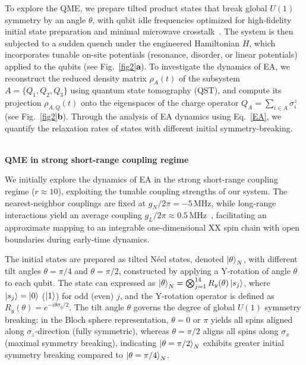 \documentclass[reprint,superscriptaddress,preprintnumbers,longbibliography,
amsmath,amssymb,aps,floatfix,pra,twocolumn, tightenlines %
]{revtex4-2}
\begin{document}
    To explore the QME, we prepare tilted product states that break global $ U(1) $ symmetry by an angle $ \theta $, with qubit idle frequencies optimized for high-fidelity initial state preparation and minimal microwave crosstalk~\cite{supp_cite}.
    The system is then subjected to a sudden quench under the engineered Hamiltonian \( H \), which incorporates tunable on-site potentials (resonance, disorder, or linear potentials) applied to the qubits (see Fig.~\ref{fig2}\textbf{a}). To investigate the dynamics of EA, we reconstruct the reduced density matrix \( \rho_A(t) \) of the subsystem \( A = \{Q_1, Q_2, Q_3\} \) using quantum state tomography (QST), and compute its projection \( \rho_{A,Q}(t) \) onto the eigenspaces of the charge operator \( Q_A = \sum_{i \in A} \sigma_i^z\) (see Fig.~\ref{fig2}\textbf{b}). Through the analysis of EA dynamics using Eq.~\eqref{EA}, we quantify the relaxation rates of states with different initial symmetry-breaking.
    
   
	~\\
	\textbf{\textbf{QME in strong short-range coupling regime}}
	
    We initially explore the dynamics of EA in the strong short-range coupling regime ($ r \approx 10 $), exploiting the tunable coupling strengths of our system. The nearest-neighbor couplings are fixed at $ g_N/2\pi = -5 \, \text{MHz} $, while long-range interactions yield an average coupling $ g_L/2\pi \approx 0.5 \, \text{MHz} $~\cite{supp_cite}, facilitating an approximate mapping to an integrable one-dimensional  XX  spin chain with open boundaries during early-time dynamics.

    The initial states are prepared as tilted Néel states, denoted  $ \ket{\theta}_N $, with different tilt angles $ \theta=\pi/4 $ and $ \theta = \pi/2 $, constructed by applying a Y-rotation of angle $ \theta $ to each qubit. The state can expressed as \( \ket{\theta}_N = \bigotimes_{j=1}^{14} R_y(\theta) \ket{s_j} \), where \( \ket{s_j} = \ket{0} \) ($\ket{1}$) for odd (even) \( j \), and the Y-rotation operator is defined as \( R_y(\theta) = e^{-i \theta \sigma_y / 2} \). The tilt angle \( \theta \) governs the degree of global \( U(1) \) symmetry breaking: in the Bloch sphere representation, \(\theta=0\) or \(\pi\) yields all spins aligned along \( \sigma_z\)-direction (fully symmetric), whereas \(\theta=\pi/2\) aligns all spins along \(\sigma_x\) (maximal symmetry breaking), indicating \( \ket{\theta= \pi/2}_N \) exhibits greater initial symmetry breaking compared to \( \ket{\theta= \pi/4}_N \).
    
\end{document}
